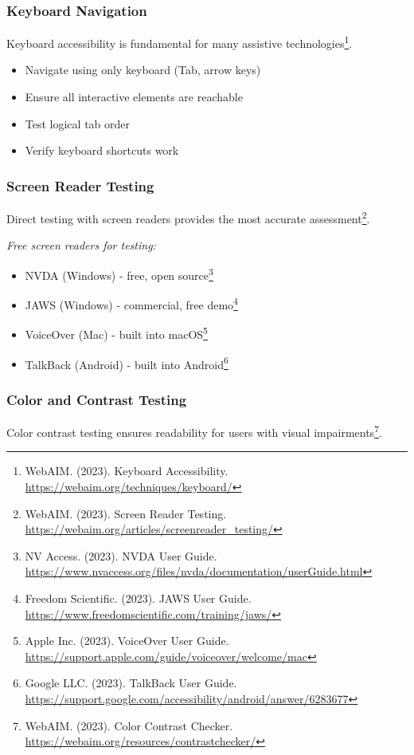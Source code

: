 \subsubsection{Keyboard Navigation}
Keyboard accessibility is fundamental for many assistive technologies\footnote{WebAIM. (2023). Keyboard Accessibility. \url{https://webaim.org/techniques/keyboard/}}.

\begin{itemize}
\item Navigate using only keyboard (Tab, arrow keys)
\item Ensure all interactive elements are reachable
\item Test logical tab order
\item Verify keyboard shortcuts work
\end{itemize}

\subsubsection{Screen Reader Testing}
Direct testing with screen readers provides the most accurate assessment\footnote{WebAIM. (2023). Screen Reader Testing. \url{https://webaim.org/articles/screenreader_testing/}}.

\emph{Free screen readers for testing:}
\begin{itemize}
\item NVDA (Windows) - free, open source\footnote{NV Access. (2023). NVDA User Guide. \url{https://www.nvaccess.org/files/nvda/documentation/userGuide.html}}
\item JAWS (Windows) - commercial, free demo\footnote{Freedom Scientific. (2023). JAWS User Guide. \url{https://www.freedomscientific.com/training/jaws/}}
\item VoiceOver (Mac) - built into macOS\footnote{Apple Inc. (2023). VoiceOver User Guide. \url{https://support.apple.com/guide/voiceover/welcome/mac}}
\item TalkBack (Android) - built into Android\footnote{Google LLC. (2023). TalkBack User Guide. \url{https://support.google.com/accessibility/android/answer/6283677}}
\end{itemize}

\subsubsection{Color and Contrast Testing}
Color contrast testing ensures readability for users with visual impairments\footnote{WebAIM. (2023). Color Contrast Checker. \url{https://webaim.org/resources/contrastchecker/}}.

